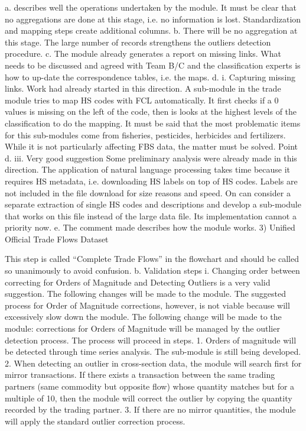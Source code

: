 \documentclass[nojss]{jss}\usepackage[]{graphicx}\usepackage[]{color}
\begin{document}
a. describes well the operations undertaken by the module. It must be clear that no aggregations are done at this stage, i.e. no information is lost. Standardization and mapping steps create additional columns.
b. There will be no aggregation at this stage. The large number of records strengthens the outliers detection procedure.
c. The module already generates a report on missing links. What needs to be discussed and agreed with Team B/C and the classification experts is how to up-date the correspondence tables, i.e. the maps.
 d. i. Capturing missing links. Work had already started in this direction. A sub-module in the trade module tries to map HS codes with FCL automatically. It first checks if a 0 values is missing on the left of the code, then is looks at the highest levels of the classification to do the mapping.
It must be said that the most problematic items for this sub-modules come from fisheries, pesticides, herbicides and fertilizers. While it is not particularly affecting FBS data, the matter must be solved.
Point d. iii. Very good suggestion Some preliminary analysis were already made in this direction. The application of natural language processing takes time because it requires HS metadata, i.e. downloading HS labels on top of HS codes. Labels are not included in the file download for size reasons and speed.
On can consider a separate extraction of single HS codes and descriptions and develop a sub-module that works on this file instead of the large data file. Its implementation cannot a priority now.
e. The comment made describes how the module works.
3)	Unified Official Trade Flows Dataset

This step is called “Complete Trade Flows” in the flowchart and should be called so unanimously to avoid confusion.
b. Validation steps
i. Changing order between correcting for Orders of Magnitude and Detecting Outliers is a very valid suggestion. The following changes will be made to the module.
The suggested process for Order of Magnitude corrections, however, is not viable because will excessively slow down the module.
The following change will be made to the module: corrections for Orders of Magnitude will be managed by the outlier detection process. The process will proceed in steps.
1.	Orders of magnitude will be detected through time series analysis. The sub-module is still being developed.
2.	When detecting an outlier in cross-section data, the module will search first for mirror transactions. If there exists a transaction between the same trading partners (same commodity but opposite flow) whose quantity matches but for a multiple of 10, then the module will correct the outlier by copying the quantity recorded by the trading partner.
3.	If there are no mirror quantities, the module will apply the standard outlier correction process.
\end{document}
